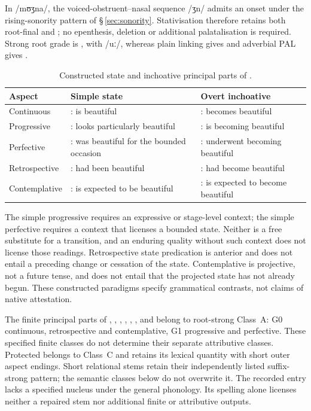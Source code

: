 In  /mʊʒna/, the voiced-obstruent--nasal sequence /ʒn/
admits an onset under the rising-sonority pattern of §\,\ref{sec:sonority}.
Stativisation therefore retains both root-final  and ;
no epenthesis, deletion or additional palatalisation is required. Strong
root grade is , with /uː/, whereas plain linking gives
 and adverbial PAL gives .

\begin{table}[htbp]
\footnotesize
\caption{Constructed state and inchoative principal parts of .}
\label{tab:stative-become}
\begin{tabularx}{\textwidth}{l L L}
\toprule
Aspect & Simple state & Overt inchoative \\
\midrule
Continuous & : is beautiful & : becomes beautiful \\
Progressive & : looks particularly beautiful & : is becoming beautiful \\
Perfective & : was beautiful for the bounded occasion & : underwent becoming beautiful \\
Retrospective & : had been beautiful & : had become beautiful \\
Contemplative & : is expected to be beautiful & : is expected to become beautiful \\
\bottomrule
\end{tabularx}
\end{table}

The simple progressive requires an expressive or stage-level context; the
simple perfective requires a context that licenses a bounded state. Neither
is a free substitute for a transition, and an enduring quality without such
context does not license those readings. Retrospective state predication is
anterior and does not entail a preceding change or cessation of the state.
Contemplative is projective, not a future tense, and does not entail that
the projected state has not already begun. These constructed paradigms specify grammatical contrasts,
not claims of native attestation.

The finite principal parts of , ,
, , , ,
 and  belong to root-strong Class~A: G0 continuous, retrospective
and contemplative, G1 progressive and perfective. These specified finite
classes do not determine their separate attributive classes. Protected
 belongs to Class~C and retains its lexical quantity with
short outer aspect endings. Short relational stems retain their independently
listed suffix-strong pattern; the semantic classes below do not overwrite it.
The recorded entry  lacks a specified nucleus under the
general phonology. Its spelling alone licenses neither a repaired stem nor
additional finite or attributive outputs.

